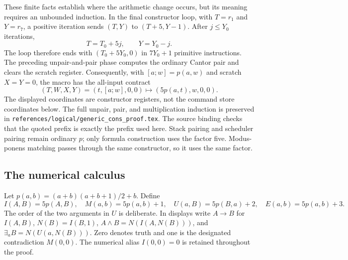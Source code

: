 These finite facts establish where the arithmetic change occurs, but its
meaning requires an unbounded induction. In the final constructor loop,
with $T=r_1$ and $Y=r_7$, a positive iteration sends
$(T,Y)$ to $(T+5,Y-1)$. After $j\leq Y_0$ iterations,
\[
                   T=T_0+5j,\qquad Y=Y_0-j.
\]
The loop therefore ends with $(T_0+5Y_0,0)$ in $7Y_0+1$ primitive
instructions. The preceding unpair-and-pair phase computes the ordinary
Cantor pair and clears the scratch register. Consequently, with
$[a;w]=p(a,w)$ and scratch $X=Y=0$, the macro has the all-input contract
\[
 (T,W,X,Y)=(t,[a;w],0,0)
 \longmapsto (5p(a,t),w,0,0).
\]
The displayed coordinates are constructor registers, not the command
store coordinates below. The full unpair, pair, and multiplication
induction is preserved in \nolinkurl{references/logical/generic_cons_proof.tex}.
The source binding checks that the quoted prefix is exactly the prefix
used here. Stack pairing and scheduler pairing remain ordinary $p$;
only formula construction uses the factor five. Modus-ponens matching
passes through the same constructor, so it uses the same factor.

\subsection{The numerical calculus}

Let $p(a,b)=(a+b)(a+b+1)/2+b$. Define
\[
 I(A,B)=5p(A,B),\quad M(a,b)=5p(a,b)+1,\quad
 U(a,B)=5p(B,a)+2,\quad E(a,b)=5p(a,b)+3.
\]
The order of the two arguments in $U$ is deliberate. In displays write
$A\to B$ for $I(A,B)$, $N(B)=I(B,1)$,
$A\wedge B=N(I(A,N(B)))$, and $\exists_a B=N(U(a,N(B)))$.
Zero denotes truth and one is the designated contradiction $M(0,0)$.
The numerical alias $I(0,0)=0$ is retained throughout the proof.

